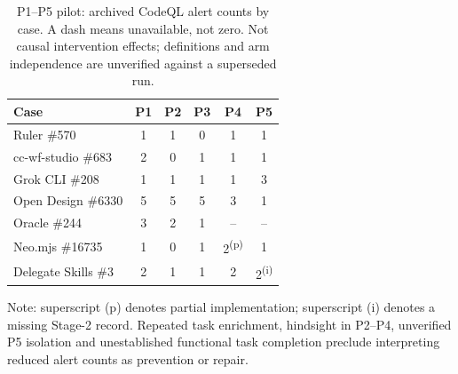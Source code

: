 \begin{table}[H]
\caption{P1--P5 pilot: archived CodeQL alert counts by case. A dash means unavailable, not zero. Not causal intervention effects; definitions and arm independence are unverified against a superseded run.}
\label{tab:p1p5}
\small
\begin{tabular}{@{}lccccc@{}}
\toprule
\textbf{Case} & \textbf{P1} & \textbf{P2} & \textbf{P3} & \textbf{P4} & \textbf{P5}\\
\midrule
Ruler \#570 & 1&1&0&1&1\\
cc-wf-studio \#683 & 2&0&1&1&1\\
Grok CLI \#208 & 1&1&1&1&3\\
Open Design \#6330 & 5&5&5&3&1\\
Oracle \#244 & 3&2&1&--&--\\
Neo.mjs \#16735 & 1&0&1&2\textsuperscript{(p)}&1\\
Delegate Skills \#3 & 2&1&1&2&2\textsuperscript{(i)}\\
\bottomrule
\end{tabular}
\par\smallskip\raggedright\footnotesize Note: superscript (p) denotes partial implementation; superscript (i) denotes a missing Stage-2 record. Repeated task enrichment, hindsight in P2--P4, unverified P5 isolation and unestablished functional task completion preclude interpreting reduced alert counts as prevention or repair.
\end{table}

{}

